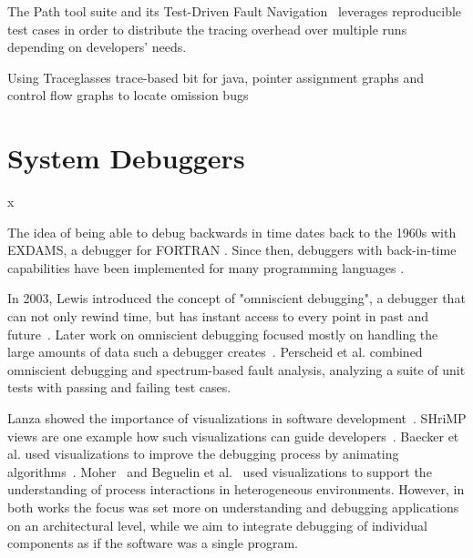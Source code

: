 \cite{perscheid13:test-driven_fault_navigation}
The Path tool suite and its Test-Driven Fault Navigation~\cite{perscheid2013} leverages reproducible test cases in order to distribute the tracing overhead over multiple runs depending on developers' needs.



\cite{sakurai15:the_omission_finder}
Using Traceglasses \cite{sakurai10:traceglasses_a_trace-based_debugger} trace-based bit for java,
pointer assignment graphs and control flow graphs to locate omission bugs

\section{System Debuggers}
\label{sec:rw_system_debugging}
x
\newpage


The idea of being able to debug backwards in time dates back to the 1960s with EXDAMS, a debugger for FORTRAN \cite{balzer_exdams_1969}.
Since then, debuggers with back-in-time capabilities have been implemented for many programming languages \cite{agrawal_debugging_1993, feldman_igor_1988, lieberman_zstep_1997}.

In 2003, Lewis introduced the concept of "omniscient debugging", a debugger that can not only rewind time, but has instant access to every point in past and future~\cite{lewis_debugging_2003}.
Later work on omniscient debugging focused mostly on handling the large amounts of data such a debugger creates~\cite{pothier_scalable_2007, lienhard_practical_2008}.
Perscheid et al. \cite{perscheid_testdriven_2013} combined omniscient debugging and spectrum-based fault analysis, analyzing a suite of unit tests with passing and failing test cases.

Lanza showed the importance of visualizations in software development~\cite{lanza2003program}.
SHriMP views are one example how such visualizations can guide developers~\cite{storey2002shrimp}.
Baecker et al. used visualizations to improve the debugging process by animating algorithms~\cite{baecker1997software}.
Moher~\cite{moher1988provide} and Beguelin et al.~\cite{beguelin1993visualization} used visualizations to support the understanding of process interactions in heterogeneous environments.
However, in both works the focus was set more on understanding and debugging applications on an architectural level, while we aim to integrate debugging of individual components as if the software was a single program.

